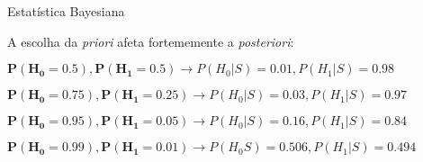 \documentclass{beamer}\usepackage[]{graphicx}\usepackage[]{color}
\begin{document}
\begin{frame}{Estatística Bayesiana}

A escolha da \emph{priori} afeta fortememente a \emph{posteriori}:
\vfill

\begin{small}

$\mathbf{P(H_0=0.5),P(H_1=0.5)} \rightarrow P(H_0|S) = 0.01, P(H_1|S) = 0.98$

\vfill

$\mathbf{P(H_0=0.75),P(H_1=0.25)} \rightarrow P(H_0|S) = 0.03 , P(H_1|S) = 0.97$

\vfill

$\mathbf{P(H_0=0.95),P(H_1=0.05)} \rightarrow P(H_0|S) = 0.16, P(H_1|S) = 0.84$

\vfill

$\mathbf{P(H_0=0.99),P(H_1=0.01)} \rightarrow P(H_0S) = 0.506, P(H_1|S) = 0.494$

\end{small}

\end{frame}
\end{document}
